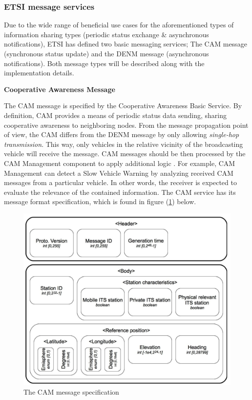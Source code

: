 \documentclass[main.tex]{subfiles}
\begin{document}
\subsubsection{ETSI message services}

Due to the wide range of beneficial use cases for the aforementioned types of information sharing
types (periodic status exchange \& asynchronous notifications), ETSI has defined two basic
messaging services; The CAM message (synchronous status update) and the DENM message
(asynchronous notifications). Both message types will be described along with the implementation 
details.

\textbf{Cooperative Awareness Message}\smallskip\newline

The CAM message is specified by the Cooperative Awareness Basic Service. By definition, CAM
provides a means of periodic status data sending, sharing cooperative awareness to neighboring
nodes. From the message propagation point of view, the CAM differs from the DENM message by 
only allowing \emph{single-hop transmission}. This way, only vehicles in the relative vicinity 
of the broadcasting vehicle will receive the message. CAM messages should be then processed by 
the CAM Management component to apply additional logic \cite{ETSI2014}. For example, CAM Management can 
detect a Slow Vehicle Warning by analyzing received CAM messages from a particular vehicle. 
In other words, the receiver is expected to evaluate the relevance of the contained information.
The CAM service has its message format specification, which is found in figure (\ref{cam-spec}) below. 

\begin{figure}[htbp]
    \centering
    \includegraphics[width=.9\textwidth]{cam-spec.png} 
    \caption{The CAM message specification \cite{Santa2013}}
    \label{cam-spec}
\end{figure}
\end{document}
